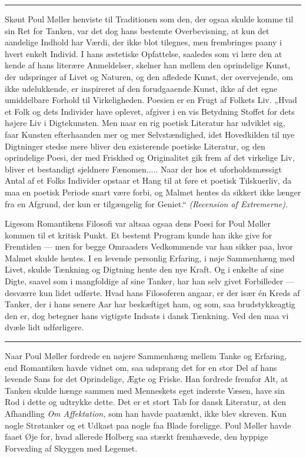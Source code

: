 \documentclass[12pt,a4paper,openany]{book}
\newcommand{\opage}[1]{\marginnote{\footnotesize\textit{[#1]}}}
\begin{document}
\begin{center}\rule{2cm}{0.4pt}\end{center}

\setcounter{footnote}{0}%
\opage{122}Skønt Poul Møller henviste til Traditionen som den, der ogsaa skulde
komme til sin Ret for Tanken, var det dog hans bestemte Overbevisning, at kun
det aandelige Indhold har Værdi, der ikke blot tilegnes, men frembringes paany
i hvert enkelt Individ. I hans æstetiske Opfattelse, saaledes som vi lære den
at kende af hans literære Anmeldelser, skelner han mellem den oprindelige
Kunst, der udspringer af Livet og Naturen, og den afledede Kunst, der
overvejende, om ikke udelukkende, er inspireret af den forudgaaende Kunst, ikke
af det egne umiddelbare Forhold til Virkeligheden. Poesien er en Frugt af
Folkets Liv. „Hvad et Folk og dets Individer have oplevet, afgiver i en vis
Betydning Stoffet for dets højere Liv i Digtekunsten. Men naar en rig poetisk
Literatur har udviklet sig, faar Kunsten efterhaanden mer og mer
Selvstændighed, idet Hovedkilden til nye Digtninger stedse mere bliver den
existerende poetiske Literatur, og den oprindelige Poesi, der med Friskhed og
Originalitet gik frem af det virkelige Liv, bliver et bestandigt sjeldnere
Fænomen..... Naar der hos et uforholdsmæssigt Antal af et Folks Individer
opstaar et Hang til at føre et poetisk Tilskuerliv, da maa en poetisk Periode
snart være forbi, og Malmet hentes da sikkert ikke længer fra en Afgrund, der
kun er tilgængelig for Geniet.“ \textit{(Recension af Extremerne).}

Ligesom Romantikens Filosofi var altsaa ogsaa dens Poesi for Poul Møller kommen
til et kritisk Punkt. Et bestemt Program kunde han ikke give for Fremtiden ---
men for begge Omraaders Vedkommende var han sikker paa, hvor Malmet skulde
hentes. I en levende personlig Erfaring, i nøje Sammenhæng med Livet, skulde
Tænkning og Digtning hente den nye Kraft. Og i enkelte af sine Digte, saavel
som i mangfoldige af sine Tanker, har han selv givet Forbilleder --- desværre
kun lidet udførte. Hvad hans Filosoferen angaar, er der især én Kreds af
Tanker, der i hans senere Aar har beskæftiget ham, og som, saa brudstykkeagtig
den er, dog betegner hans vigtigste Indsats i dansk Tænkning. Ved den maa vi
dvæle lidt udførligere.

\begin{center}\rule{2cm}{0.4pt}\end{center}

\setcounter{footnote}{0}%
\opage{123}Naar Poul Møller fordrede en nøjere Sammenhæng mellem Tanke og
Erfaring, end Romantiken havde vidnet om, saa udsprang det for en stor Del af
hans levende Sans for det Oprindelige, Ægte og Friske. Han fordrede fremfor
Alt, at Tanken skulde hænge sammen med Menneskets eget inderste Væsen, have sin
Rod i dette og udtrykke dette. Det er et stort Tab for dansk Literatur, at den
Afhandling \textit{Om Affektation,} som han havde paatænkt, ikke blev skreven.
Kun nogle Strøtanker og et Udkast paa nogle faa Blade foreligge. Poul Møller
havde faaet Øje for, hvad allerede Holberg saa stærkt fremhævede, den hyppige
Forvexling af Skyggen med Legemet.
\end{document}

